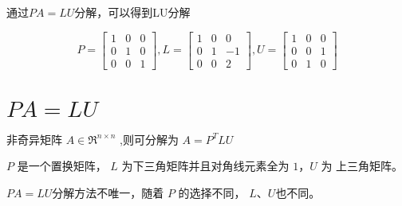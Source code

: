 \begin{example}
    通过$PA=LU$分解，可以得到LU分解

    \begin{equation}P=\left[\begin{matrix}
        1 & 0 & 0\\
        0 & 1 & 0\\
        0 & 0 & 1
        \end{matrix}\right] ,L=\left[\begin{matrix}
        1 & 0 & 0\\
        0 & 1 & -1\\
        0 & 0 & 2
        \end{matrix}\right] ,U=\left[\begin{matrix}
        1 & 0 & 0\\
        0 & 0 & 1\\
        0 & 1 & 0
        \end{matrix}\right]\end{equation}
\end{example}

\section{\texorpdfstring{$PA=LU$}{PA=LU}}

\begin{theorem}
    非奇异矩阵 $ {A} \in \mathfrak{R}^{n \times n} $ ,则可分解为 $ A=P^{T} L U $

    $ P $ 是一个置换矩阵， $ L $ 为下三角矩阵并且对角线元素全为 $ 1 ， U $ 为 上三角矩阵。
\end{theorem}


$PA=LU$分解方法不唯一，随着 $ P $ 的选择不同， $L$、$U$也不同。

